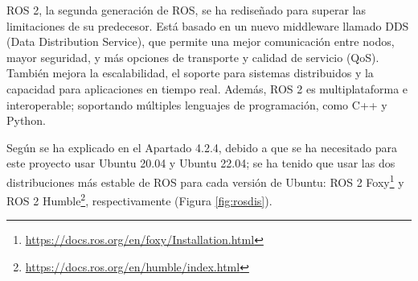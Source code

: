 ROS 2, la segunda generación de ROS, se ha rediseñado para superar las limitaciones de su predecesor. Está basado en un nuevo middleware llamado DDS (Data Distribution Service), que permite una mejor comunicación entre nodos, mayor seguridad, y más opciones de transporte y calidad de servicio (QoS). También mejora la escalabilidad, el soporte para sistemas distribuidos y la capacidad para aplicaciones en tiempo real. Además, ROS 2 es multiplataforma e interoperable; soportando múltiples lenguajes de programación, como C++ y Python.



Según se ha explicado en el Apartado 4.2.4, debido a que se ha necesitado para este proyecto usar Ubuntu 20.04 y Ubuntu 22.04; se ha tenido que usar las dos distribuciones más estable de ROS para cada versión de Ubuntu: ROS 2 Foxy\footnote{\url{https://docs.ros.org/en/foxy/Installation.html}} y ROS 2 Humble\footnote{\url{https://docs.ros.org/en/humble/index.html}}, respectivamente (Figura \ref{fig:rosdis}).


